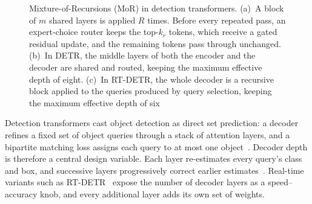 \documentclass[pdflatex,iicol,sn-basic,Numbered]{sn-jnl}
\newcommand{\figsmall}{\fontsize{7}{8.4}\selectfont}
\begin{document}
\begin{figure}[t]
\caption{Mixture-of-Recursions (MoR) in detection transformers. (a)~A block of $m$ shared layers is applied $R$ times. Before every repeated pass, an expert-choice router keeps the top-$k_r$ tokens, which receive a gated residual update, and the remaining tokens pass through unchanged. (b)~In DETR, the middle layers of both the encoder and the decoder are shared and routed, keeping the maximum effective depth of eight. (c)~In RT-DETR, the whole decoder is a recursive block applied to the queries produced by query selection, keeping the maximum effective depth of six}
\label{fig:schematic}
\end{figure}


Detection transformers cast object detection as direct set prediction: a decoder refines a fixed set of object queries through a stack of attention layers, and a bipartite matching loss assigns each query to at most one object~\cite{carion2020detr}. Decoder depth is therefore a central design variable. Each layer re-estimates every query's class and box, and successive layers progressively correct earlier estimates~\cite{carion2020detr,zhu2021deformable}. Real-time variants such as RT-DETR~\cite{zhao2024rtdetr} expose the number of decoder layers as a speed--accuracy knob, and every additional layer adds its own set of weights.
\end{document}
